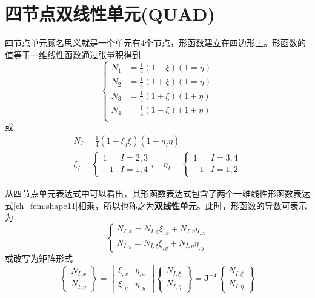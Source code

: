 \section{四节点双线性单元(QUAD)}
四节点单元顾名思义就是一个单元有4个节点，形函数建立在四边形上。形函数的值等于一维线性函数通过张量积得到
\begin{equation}
\left \{
\begin{split}
N_1 &= \frac{1}{4}(1-\xi)(1=\eta) \\
N_2 &= \frac{1}{4}(1+\xi)(1=\eta) \\
N_3 &= \frac{1}{4}(1+\xi)(1+\eta) \\
N_4 &= \frac{1}{4}(1-\xi)(1+\eta) \\
\end{split}
\right .
\end{equation}
或
\begin{equation}
\begin{split}
N_I = \frac{1}{4}(1+\xi_I \xi)(1+\eta_I \eta) \\
\xi_I =
\begin{cases}
1 & I = 2,3 \\
-1 & I = 1,4
\end{cases}, \quad
\eta_I =
\begin{cases}
1 & I = 3,4 \\
-1 & I = 1,2
\end{cases}
\end{split}
\end{equation}\par
从四节点单元表达式中可以看出，其形函数表达式包含了两个一维线性形函数表达式\eqref{ch_fem:shape11}相乘，所以也称之为\textbf{双线性单元}。此时，形函数的导数可表示为
\begin{equation}
\begin{cases}
N_{I,x} = N_{I,\xi} \xi_{,x} + N_{I,\eta} \eta_{,x} \\
N_{I,y} = N_{I,\xi} \xi_{,y} + N_{I,\eta} \eta_{,y}
\end{cases}
\end{equation}
或改写为矩阵形式
\begin{equation}\label{ch_fem:dshape2}
\begin{Bmatrix}
N_{I,x} \\ N_{I,y}
\end{Bmatrix} =
\begin{bmatrix}
\xi_{,x} & \eta_{,x} \\
\xi_{,y} & \eta_{,y}
\end{bmatrix}
\begin{Bmatrix}
N_{I,\xi} \\ N_{I,\eta}
\end{Bmatrix} =
\boldsymbol J^{-T}
\begin{Bmatrix}
N_{I,\xi} \\ N_{I,\eta}
\end{Bmatrix}
\end{equation}
